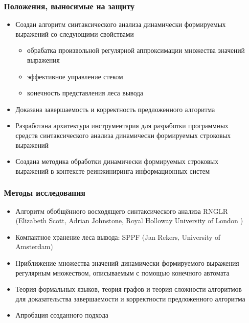 \documentclass{beamer}
\begin{document}
\begin{frame}
    \transwipe[direction=90]
    \frametitle{Положения, выносимые на защиту}
        \begin{itemize}
            \item Создан алгоритм синтаксического анализа динамически формируемых выражений со 
            следующими свойствами
            \begin{itemize}
                \item обрабатка произвольной регулярной аппроксимации множества значений выражения 
                \item эффективное управление стеком 
                \item конечность представления леса вывода              
            \end{itemize}
            \item Доказана завершаемость и корректность предложенного алгоритма
            \item Разработана архитектура инструментария для разработки программных средств 
            синтаксического анализа динамически формируемых строковых выражений
            \item Создана методика обработки динамически формируемых строковых выражений в контексте реинжиниринга информационных систем  
        \end{itemize}
\end{frame}


\begin{frame}
    \transwipe[direction=90]
    \frametitle{Методы исследования}
        \begin{itemize}
            \item Алгоритм обобщённого восходящего синтаксического анализа RNGLR (Elizabeth Scott, Adrian Johnstone, Royal Holloway University of London )
            \item Компактное хранение леса вывода: SPPF (Jan Rekers, University of Amsterdam)
            \item Приближение множества значений динамически формируемого выражения регулярным множеством, описываемым с помощью конечного автомата
            \item Теория формальных языков, теория графов и теория сложности алгоритмов для доказательства завершаемости и корректности предложенного алгоритма            
            \item Апробация созданного подхода 
        \end{itemize}
\end{frame}
\end{document}
